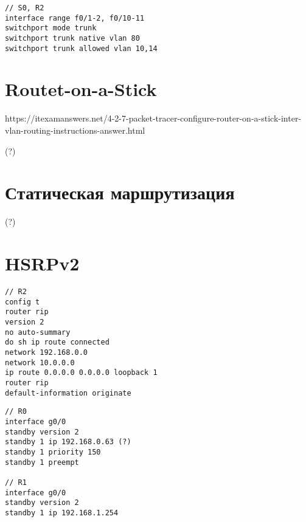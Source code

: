 \begin{verbatim}
// S0, R2
interface range f0/1-2, f0/10-11
switchport mode trunk
switchport trunk native vlan 80
switchport trunk allowed vlan 10,14
\end{verbatim}

\section{Routet-on-a-Stick}

https://itexamanswers.net/4-2-7-packet-tracer-configure-router-on-a-stick-inter-vlan-routing-instructions-answer.html

(?)

\section{Статическая маршрутизация}

(?)

\section{HSRPv2}

\begin{verbatim}
// R2
config t
router rip
version 2
no auto-summary
do sh ip route connected
network 192.168.0.0
network 10.0.0.0
ip route 0.0.0.0 0.0.0.0 loopback 1
router rip
default-information originate
\end{verbatim}

\begin{verbatim}
// R0
interface g0/0
standby version 2
standby 1 ip 192.168.0.63 (?)
standby 1 priority 150
standby 1 preempt

// R1
interface g0/0
standby version 2
standby 1 ip 192.168.1.254
\end{verbatim}

